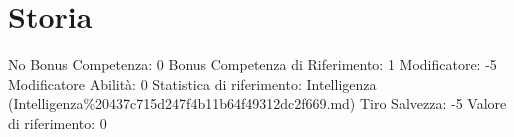 \section{Storia}\label{storia}

\begin{description}
\tightlist
\item[Tags: ABI]
No Bonus Competenza: 0 Bonus Competenza di Riferimento: 1 Modificatore:
-5 Modificatore Abilità: 0 Statistica di riferimento: Intelligenza
(Intelligenza\%20437c715d247f4b11b64f49312dc2f669.md) Tiro Salvezza: -5
Valore di riferimento: 0
\end{description}
